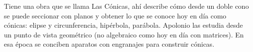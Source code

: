 Tiene una obra que se llama Las Cónicas, ahí describe cómo desde un doble cono se puede seccionar con planos y obtener lo que se conoce hoy en día como cónicas: elipse y circunferencia, hipérbola, parábola. Apolonio las estudia desde un punto de vista geométrico (no algebraico como hoy en día con matrices). En esa época se conciben aparatos con engranajes para construir cónicas.